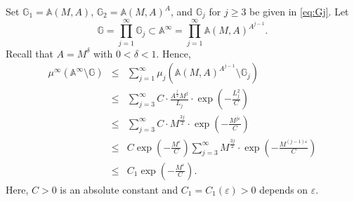 \documentclass[12pt,reqno]{amsart}
\newcommand\Ab{\mathbb{A}}
\newcommand\Gb{\mathbb{G}}
\newcommand\ve{\varepsilon}
\theoremstyle{plain}
\theoremstyle{remark}
\numberwithin{equation}{section}
\begin{document}
Set $\Gb_1=\Ab(M,A)$, $\Gb_2=\Ab(M,A)^A$, and $\Gb_j$ for $j\ge3$ be given in \eqref{eq:Gj}. Let
$$\Gb=\prod_{j=1}^\infty\Gb_j\subset\Ab^\infty=\prod_{j=1}^\infty\Ab(M,A)^{A^{j-1}}.$$
Recall that $A=M^\delta$ with $0<\delta<1$. Hence,
\begin{eqnarray*}
\mu^\infty\left(\Ab^\infty\setminus\Gb\right)&\le&\sum_{j=1}^\infty\mu_j\left(\Ab(M,A)^{A^{j-1}}\setminus\Gb_j\right)\\
&\le&\sum_{j=3}^\infty C\cdot\frac{A^{\frac j2}M^j}{L_j}\cdot\exp\left(-\frac{L_j^2}{C}\right)\\
&\le&\sum_{j=3}^\infty C\cdot M^{\frac{3j}{2}}\cdot\exp\left(-\frac{M^{j\ve}}{C}\right)\\
&\le&C\exp\left(-\frac{M^\ve}{C}\right)\sum_{j=3}^\infty M^{\frac{3j}{2}}\cdot\exp\left(-\frac{M^{(j-1)\ve}}{C}\right)\\
&\le&C_1\exp\left(-\frac{M^\ve}{C}\right).
\end{eqnarray*}
Here, $C>0$ is an absolute constant and $C_1=C_1(\ve)>0$ depends on $\ve$.
\end{document}
